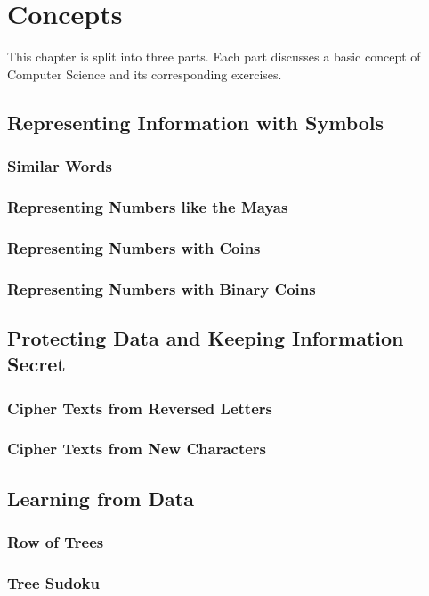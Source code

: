 \chapter{Concepts}

This chapter is split into three parts. Each part discusses a basic concept of Computer Science and its corresponding exercises.

\section{Representing Information with Symbols}

\subsection{Similar Words}

\subsection{Representing Numbers like the Mayas}

\subsection{Representing Numbers with Coins}

\subsection{Representing Numbers with Binary Coins}

\section{Protecting Data and Keeping Information Secret}

\subsection{Cipher Texts from Reversed Letters}

\subsection{Cipher Texts from New Characters}

\section{Learning from Data}

\subsection{Row of Trees}

\subsection{Tree Sudoku}